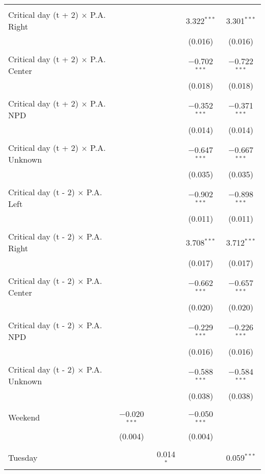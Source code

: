 \documentclass[
]{article}
\begin{document}
\begin{table}[!htbp]
{\begin{tabular}{@{\extracolsep{5pt}}lcccc}
  & & & & \\ 
 Critical day (t + 2) $\times$ P.A. Right &  &  & 3.322$^{***}$ & 3.301$^{***}$ \\ 
  &  &  & (0.016) & (0.016) \\ 
  & & & & \\ 
 Critical day (t + 2) $\times$ P.A. Center &  &  & $-$0.702$^{***}$ & $-$0.722$^{***}$ \\ 
  &  &  & (0.018) & (0.018) \\ 
  & & & & \\ 
 Critical day (t + 2) $\times$ P.A. NPD &  &  & $-$0.352$^{***}$ & $-$0.371$^{***}$ \\ 
  &  &  & (0.014) & (0.014) \\ 
  & & & & \\ 
 Critical day (t + 2) $\times$ P.A. Unknown &  &  & $-$0.647$^{***}$ & $-$0.667$^{***}$ \\ 
  &  &  & (0.035) & (0.035) \\ 
  & & & & \\ 
 Critical day (t - 2) $\times$ P.A. Left &  &  & $-$0.902$^{***}$ & $-$0.898$^{***}$ \\ 
  &  &  & (0.011) & (0.011) \\ 
  & & & & \\ 
 Critical day (t - 2) $\times$ P.A. Right &  &  & 3.708$^{***}$ & 3.712$^{***}$ \\ 
  &  &  & (0.017) & (0.017) \\ 
  & & & & \\ 
 Critical day (t - 2) $\times$ P.A. Center &  &  & $-$0.662$^{***}$ & $-$0.657$^{***}$ \\ 
  &  &  & (0.020) & (0.020) \\ 
  & & & & \\ 
 Critical day (t - 2) $\times$ P.A. NPD &  &  & $-$0.229$^{***}$ & $-$0.226$^{***}$ \\ 
  &  &  & (0.016) & (0.016) \\ 
  & & & & \\ 
 Critical day (t - 2) $\times$ P.A. Unknown &  &  & $-$0.588$^{***}$ & $-$0.584$^{***}$ \\ 
  &  &  & (0.038) & (0.038) \\ 
  & & & & \\ 
 Weekend & $-$0.020$^{***}$ &  & $-$0.050$^{***}$ &  \\ 
  & (0.004) &  & (0.004) &  \\ 
  & & & & \\ 
 Tuesday &  & 0.014$^{*}$ &  & 0.059$^{***}$ \\ 

\end{tabular}}
\end{table}
\end{document}
